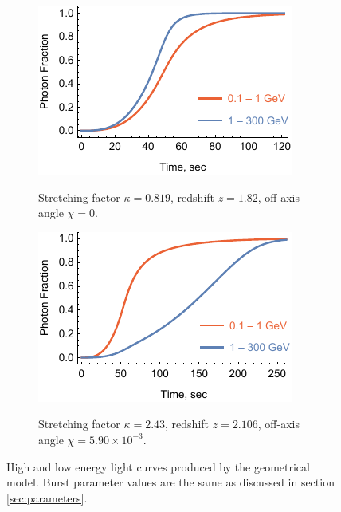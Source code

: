 \documentclass{article}
\begin{document}
	\begin{figure}
		\centering
		\hspace*{\fill}
		\begin{subfigure}{0.45\textwidth}
			\includegraphics[width=\textwidth]{sampleLightCurveLogNegative}
			\label{fig:sampleLightCurveLogNegative}
			\caption{Stretching factor $\kappa = 0.819$, redshift $z = 1.82$, off-axis angle $\chi = 0$.}
		\end{subfigure}
		\hfill
		\begin{subfigure}{0.45\textwidth}
			\includegraphics[width=\textwidth]{sampleLightCurveLogPositive}
			\label{fig:sampleLightCurveLogPosivie}
			\caption{Stretching factor $\kappa = 2.43$, redshift $z = 2.106$, off-axis angle $\chi = 5.90 \times 10^{-3}$.}
		\end{subfigure}
		\hspace*{\fill}
		\caption{
			High and low energy light curves produced by the geometrical model.
			Burst parameter values are the same as discussed in section \ref{sec:parameters}.
		}
		\label{fig:sampleLightCurves}
	\end{figure}
\end{document}
